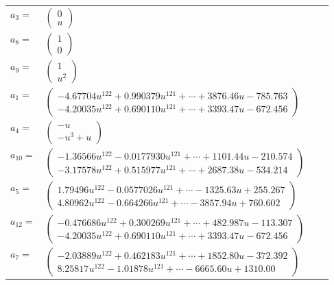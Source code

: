 \documentclass[1p]{elsarticle_modified}
\theoremstyle{definition}
\begin{document}
\begin{tabular}{m{7pt} m{180pt} m{7pt} m{180pt} }
\flushright $a_{3}=$&$\begin{pmatrix}0\\u\end{pmatrix}$ \\
\flushright $a_{8}=$&$\begin{pmatrix}1\\0\end{pmatrix}$ \\
\flushright $a_{9}=$&$\begin{pmatrix}1\\u^2\end{pmatrix}$ \\
\flushright $a_{1}=$&$\begin{pmatrix}-4.67704 u^{122}+0.990379 u^{121}+\cdots+3876.46 u-785.763\\-4.20035 u^{122}+0.690110 u^{121}+\cdots+3393.47 u-672.456\end{pmatrix}$ \\
\flushright $a_{4}=$&$\begin{pmatrix}- u\\- u^3+u\end{pmatrix}$ \\
\flushright $a_{10}=$&$\begin{pmatrix}-1.36566 u^{122}-0.0177930 u^{121}+\cdots+1101.44 u-210.574\\-3.17578 u^{122}+0.515977 u^{121}+\cdots+2687.38 u-534.214\end{pmatrix}$ \\
\flushright $a_{5}=$&$\begin{pmatrix}1.79496 u^{122}-0.0577026 u^{121}+\cdots-1325.63 u+255.267\\4.80962 u^{122}-0.664266 u^{121}+\cdots-3857.94 u+760.602\end{pmatrix}$ \\
\flushright $a_{12}=$&$\begin{pmatrix}-0.476686 u^{122}+0.300269 u^{121}+\cdots+482.987 u-113.307\\-4.20035 u^{122}+0.690110 u^{121}+\cdots+3393.47 u-672.456\end{pmatrix}$ \\
\flushright $a_{7}=$&$\begin{pmatrix}-2.03889 u^{122}+0.462183 u^{121}+\cdots+1852.80 u-372.392\\8.25817 u^{122}-1.01878 u^{121}+\cdots-6665.60 u+1310.00\end{pmatrix}$ \\

\end{tabular}
\end{document}
